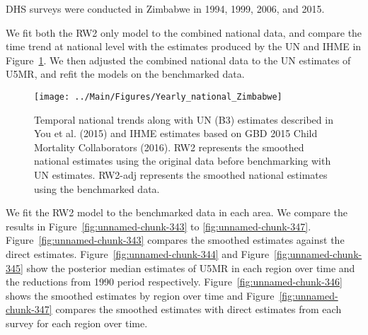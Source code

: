 \documentclass[12pt]{article}\usepackage[]{graphicx}\usepackage[]{color}
\newenvironment{knitrout}{}{} %
\begin{document}


DHS surveys were conducted in Zimbabwe in 1994, 1999, 2006, and 2015.

We fit both the RW2 only model to the combined national data, and compare the time trend at national level with the estimates produced by the UN and IHME in Figure~\ref{fig:unnamed-chunk-342}. We then adjusted the combined national data to the UN estimates of U5MR, and refit the models on the benchmarked data. 

\begin{knitrout}
\color{fgcolor}\begin{figure}[bht]

{\centering \texttt{[image: ../Main/Figures/Yearly\_national\_Zimbabwe]} 

}

\caption[Temporal national trends along with UN (B3) estimates described in You et al]{Temporal national trends along with UN (B3) estimates described in You et al. (2015) and IHME estimates based on GBD 2015 Child Mortality Collaborators (2016). RW2 represents the smoothed national estimates using the original data before benchmarking with UN estimates. RW2-adj represents the smoothed national estimates using the benchmarked data.}\label{fig:unnamed-chunk-342}
\end{figure}


\end{knitrout}
 

We fit the RW2 model to the benchmarked data in each area. 
We compare the results in Figure~\ref{fig:unnamed-chunk-343} to \ref{fig:unnamed-chunk-347}.
Figure~\ref{fig:unnamed-chunk-343} compares the smoothed estimates against the direct estimates. Figure~\ref{fig:unnamed-chunk-344} and Figure~\ref{fig:unnamed-chunk-345} show the posterior median estimates of U5MR in each region over time and the reductions from 1990 period respectively.
Figure~\ref{fig:unnamed-chunk-346} shows the smoothed estimates by region over time and Figure~\ref{fig:unnamed-chunk-347} compares the smoothed estimates with direct estimates from each survey for each region over time.


\end{document}
